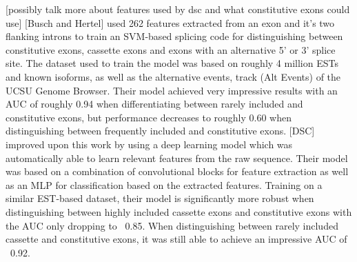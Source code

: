 [possibly talk more about features used by dsc and what constitutive exons could use]
[Busch and Hertel] used 262 features extracted from an exon and it's two flanking introns to train an SVM-based splicing code for distinguishing between constitutive exons, cassette exons and exons with an alternative 5' or 3' splice site. The dataset used to train the model was based on roughly 4 million ESTs and known isoforms, as well as the alternative events, track (Alt Events) of the UCSU Genome Browser.
Their model achieved very impressive results with an AUC of roughly 0.94 when differentiating between rarely included and constitutive exons, but performance decreases to roughly 0.60 when distinguishing between frequently included and constitutive exons. [DSC] improved upon this work by using a deep learning model which was automatically able to learn relevant features from the raw sequence. Their model was based on a combination of convolutional blocks for feature extraction as well as an MLP for classification based on the extracted features. Training on a similar EST-based dataset, their model is significantly more robust when distinguishing between highly included cassette exons and constitutive exons with the AUC only dropping to ~0.85. When distinguishing between rarely included cassette and constitutive exons, it was still able to achieve an impressive AUC of ~0.92.

